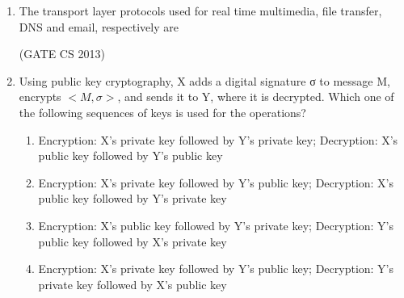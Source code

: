 \documentclass[a4paper, 11pt]{article}
\begin{document}
\begin{enumerate}
\begin{center}
\begin{multicols}{2}
    \noindent\textbf{\underline{GROUP II}}
    \begin{enumerate}[label=(\arabic*)]
        \item Interoperability
        \item BPMN
        \item Publish-find-bind
        \item XML
    \end{enumerate}
    \end{multicols}
    \end{center}
    \begin{enumerate}
    \end{enumerate}
    \hfill (GATE CS 2013)
    \item The transport layer protocols used for real time multimedia, file transfer, DNS and email, respectively are
    \begin{enumerate}
    \end{enumerate}

    \hfill (GATE CS 2013)
    
    \item Using public key cryptography, X adds a digital signature σ to message M, encrypts $<M, \sigma>$, and sends it to Y, where it is decrypted. Which one of the following sequences of keys is used for the operations? 
    \begin{enumerate}
        \item  Encryption: X’s private key followed by Y’s private key; Decryption: X’s public key followed by Y’s public key
        \item Encryption: X’s private key followed by Y’s public key; Decryption: X’s public key followed by Y’s private key
        \item Encryption: X’s public key followed by Y’s private key; Decryption: Y’s public key followed by X’s private key
        \item Encryption: X’s private key followed by Y’s public key; Decryption: Y’s private key followed by X’s public key
    \end{enumerate}


\end{enumerate}
\end{document}
